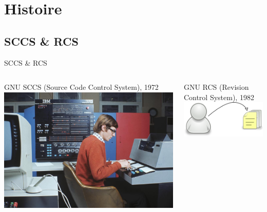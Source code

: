 \section{Histoire}
\subsection{SCCS \& RCS}
\begin{frame}{SCCS \& RCS}
  \begin{columns}[T]

    \begin{column}{.5\textwidth}
      GNU SCCS (Source Code Control System), 1972
      \includegraphics[width=\textwidth]{./ibm-system-370.png}
    \end{column}

    \begin{column}{.5\textwidth}
      GNU RCS (Revision Control System), 1982
      \includegraphics[width=\textwidth]{./rcs-model.png}
    \end{column}

  \end{columns}
\end{frame}

